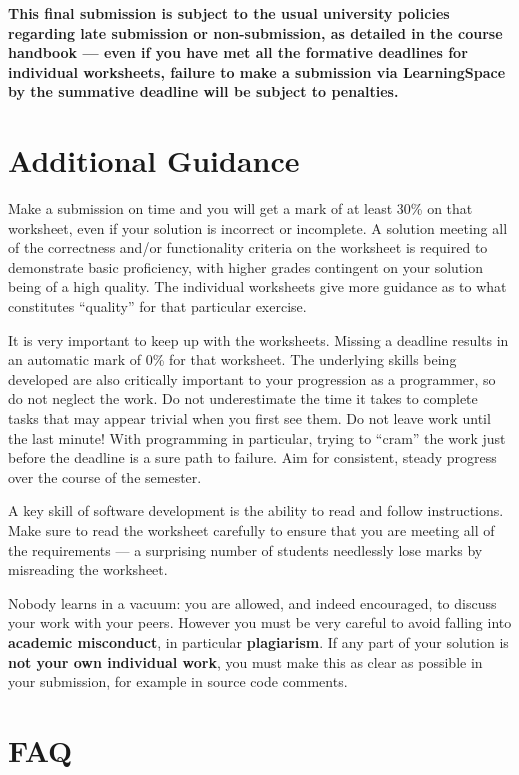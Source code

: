 \documentclass{../../fal_assignment}
\begin{document}
\textbf{This final submission is subject to the usual university policies regarding late submission or non-submission,
as detailed in the course handbook ---
even if you have met all the formative deadlines for individual worksheets,
failure to make a submission via LearningSpace by the summative deadline will be subject to penalties.}

\section*{Additional Guidance}

Make a submission on time and you will get a mark of at least 30\% on that worksheet,
even if your solution is incorrect or incomplete.
A solution meeting all of the correctness and/or functionality criteria on the worksheet is required to demonstrate basic proficiency,
with higher grades contingent on your solution being of a high quality.
The individual worksheets give more guidance as to what constitutes ``quality'' for that particular exercise.

It is very important to keep up with the worksheets. Missing a deadline results in an automatic mark of 0\% for that worksheet.
The underlying skills being developed are also critically important to your progression as a programmer, so do not neglect the work.
Do not underestimate the time it takes to complete tasks that may appear trivial when you first see them.
Do not leave work until the last minute! With programming in particular, trying to ``cram'' the work just before the deadline is a sure path to failure. Aim for consistent, steady progress over the course of the semester.

A key skill of software development is the ability to read and follow instructions.
Make sure to read the worksheet carefully to ensure that you are meeting all of the requirements ---
a surprising number of students needlessly lose marks by misreading the worksheet.

Nobody learns in a vacuum: you are allowed, and indeed encouraged, to discuss your work with your peers. However you must be very careful to avoid falling into \textbf{academic misconduct}, in particular \textbf{plagiarism}. If any part of your solution is \textbf{not your own individual work}, you must make this as clear as possible in your submission, for example in source code comments.

\section*{FAQ}
\end{document}

